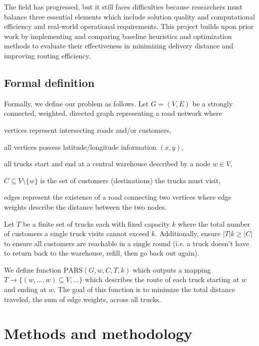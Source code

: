 \documentclass[conference]{IEEEtran}
\begin{document}
The field has progressed, but it still faces difficulties because researchers must balance three essential elements which include solution quality and computational efficiency and real-world operational requirements. This project builds upon prior work by implementing and comparing baseline heuristics and optimization methods to evaluate their effectiveness in minimizing delivery distance and improving routing efficiency.

\subsection{Formal definition}

Formally, we define our problem as follows. Let $G=(V,E)$ be a strongly connected, weighted, directed graph representing a road network where

\begin{itemize}
    {\parskip=0pt
    \item vertices represent intersecting roads and/or customers,
    \item all vertices possess latitude/longitude information $(x,y)$,
    \item all trucks start and end at a central warehouse described by a node $w\in V$,
    \item $C\subseteq V\setminus\{w\}$ is the set of customers (destinations) the trucks must visit,
    \item edges represent the existence of a road connecting two vertices where edge weights describe the distance between the two nodes.}
\end{itemize}

Let $T$ be a finite set of trucks each with fixed capacity $k$ where the total number of customers a single truck visits cannot exceed $k$. Additionally, ensure $|T|k\geq|C|$ to ensure all customers are reachable in a single round (i.e. a truck doesn't have to return back to the warehouse, refill, then go back out again).

We define function $\mathrm{PARS}(G,w,C,T,k)$ which outputs a mapping $T\to\{(w,\dots,w)\subseteq V,\dots\}$ which describes the route of each truck starting at $w$ and ending at $w$. The goal of this function is to minimize the total distance traveled, the sum of edge weights, across all trucks.

\section{Methods and methodology}
\end{document}
